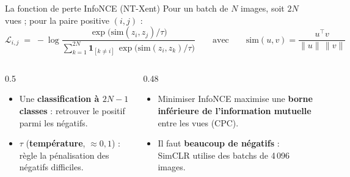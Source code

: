 \documentclass[aspectratio=169,10pt]{beamer}
\newcommand{\src}[1]{\par\vfill\hfill{\tiny\color{grisE}#1}}
\begin{document}
\begin{frame}{La fonction de perte InfoNCE (NT-Xent)}
  Pour un batch de $N$ images, soit $2N$ vues ; pour la paire positive $(i,j)$ :
  \begin{equation*}
    \mathcal{L}_{i,j} \;=\; -\log \frac{\exp\big(\mathrm{sim}(z_i, z_j)/\tau\big)}{\displaystyle\sum_{k=1}^{2N} \mathbf{1}_{[k\neq i]}\,\exp\big(\mathrm{sim}(z_i, z_k)/\tau\big)}
    \qquad\text{avec}\qquad \mathrm{sim}(u,v) = \frac{u^\top v}{\|u\|\,\|v\|}
  \end{equation*}
  \begin{columns}[T]
    \begin{column}{0.5\textwidth}
      \begin{itemize}\small
        \setlength{\itemsep}{1mm}
        \item Une \textbf{classification à $2N-1$ classes} : retrouver le positif parmi les négatifs.
        \item $\tau$ (\textbf{température}, $\approx 0{,}1$) : règle la pénalisation des négatifs difficiles.
      \end{itemize}
    \end{column}
    \begin{column}{0.48\textwidth}
      \begin{itemize}\small
        \setlength{\itemsep}{1mm}
        \item Minimiser InfoNCE maximise une \textbf{borne inférieure de l'information mutuelle} entre les vues (CPC).
        \item Il faut \textbf{beaucoup de négatifs} : SimCLR utilise des batchs de 4\,096 images.
      \end{itemize}
    \end{column}
  \end{columns}
  \src{\citet{oord2018cpc,chen2020simclr}}
\end{frame}
\end{document}
